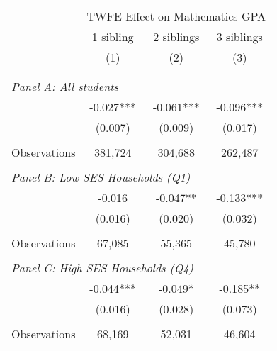 \makeatletter
{}
{
\makeatother
\begin{tabular}{lccc}
\toprule
\cmidrule(lr){2-4}
& \multicolumn{3}{c}{TWFE Effect on Mathematics GPA} \\
\cmidrule(lr){2-4}
& 1 sibling & 2 siblings & 3 siblings  \\
\cmidrule(lr){2-2} \cmidrule(lr){3-3} \cmidrule(lr){4-4}
& (1) & (2) & (3)\\
\bottomrule
&  &  &  \\
&  &  &   \\
\multicolumn{4}{l}{\textit{Panel A: All students}} \\
\hspace{3mm}        &      -0.027***&      -0.061***&      -0.096***\\
                    &     (0.007)   &     (0.009)   &     (0.017)   \\
                    &               &               &               \\
\hspace{3mm}Observations&     381,724   &     304,688   &     262,487   \\
 
&  &  &   \\
\multicolumn{4}{l}{\textit{Panel B: Low SES Households (Q1)}} \\
\hspace{3mm}        &      -0.016   &      -0.047** &      -0.133***\\
                    &     (0.016)   &     (0.020)   &     (0.032)   \\
                    &               &               &               \\
\hspace{3mm}Observations&      67,085   &      55,365   &      45,780   \\
 
&  &  &   \\
\multicolumn{4}{l}{\textit{Panel C: High SES Households (Q4)}} \\
\hspace{3mm}        &      -0.044***&      -0.049*  &      -0.185** \\
                    &     (0.016)   &     (0.028)   &     (0.073)   \\
                    &               &               &               \\
\hspace{3mm}Observations&      68,169   &      52,031   &      46,604   \\
 

\end{tabular}}
